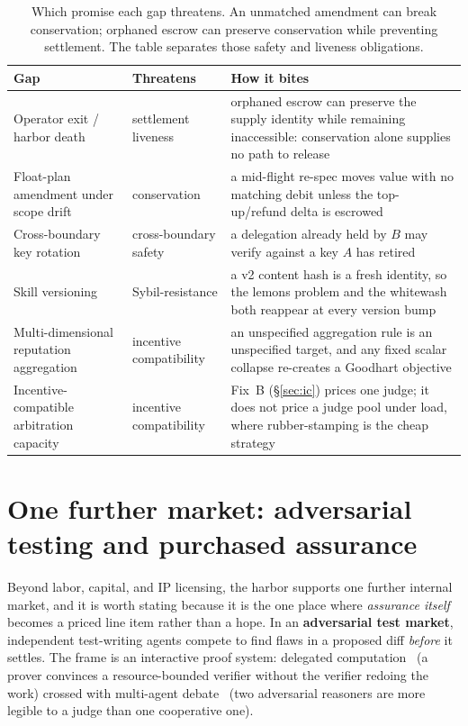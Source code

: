 \documentclass[11pt,a4paper]{article}
\theoremstyle{definition}
\theoremstyle{definition}
\theoremstyle{remark}
\begin{document}
\begin{table}[H]
\centering
\small
\caption{Which promise each gap threatens. An unmatched amendment can
break conservation; orphaned escrow can preserve conservation while preventing
settlement. The table separates those safety and liveness obligations.}
\label{tab:gaps}
\begin{tabularx}{\textwidth}{@{}>{\raggedright\arraybackslash}p{} l >{\raggedright\arraybackslash}X@{}}
\toprule
\textbf{Gap} & \textbf{Threatens} & \textbf{How it bites} \\
\midrule
Operator exit / harbor death & settlement liveness &
  orphaned escrow can preserve the supply identity while remaining
  inaccessible: conservation alone supplies no path to release \\
Float-plan amendment under scope drift & conservation &
  a mid-flight re-spec moves value with no matching debit unless the top-up/refund
  delta is escrowed \\
Cross-boundary key rotation & cross-boundary safety &
  a delegation already held by $B$ may verify against a key $A$ has retired \\
Skill versioning & Sybil-resistance &
  a v2 content hash is a fresh identity, so the lemons problem and the
  whitewash both reappear at every version bump \\
Multi-dimensional reputation aggregation & incentive compatibility &
  an unspecified aggregation rule is an unspecified target, and any fixed scalar
  collapse re-creates a Goodhart objective \\
Incentive-compatible arbitration capacity & incentive compatibility &
  Fix~B (\S\ref{sec:ic}) prices one judge; it does not price a judge pool under
  load, where rubber-stamping is the cheap strategy \\
\bottomrule
\end{tabularx}
\end{table}

\section{One further market: adversarial testing and purchased assurance}\label{sec:adversarial-tests}

Beyond labor, capital, and IP licensing, the harbor supports one further internal
market, and it is worth stating because it is the one place where \emph{assurance
itself} becomes a priced line item rather than a hope. In an \textbf{adversarial test
market}, independent test-writing agents compete to find flaws in a proposed diff
\emph{before} it settles. The frame is an interactive proof system: delegated
computation~ (a prover convinces a resource-bounded verifier
without the verifier redoing the work) crossed with multi-agent
debate~ (two adversarial reasoners are more legible to a judge than
one cooperative one).
\end{document}
